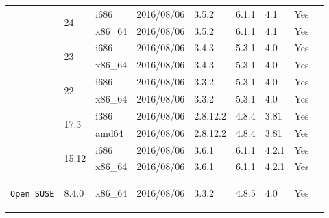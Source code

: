 \documentclass[11pt,twoside,openany,x11names,svgnames]{memoir}
\begin{document}
{\begin{longtable}{| >{\bfseries}p{3cm} | p{2cm} | p{1cm} | p{2cm} | p{1.2cm} | p{1cm} | p{1cm} | p{1cm} | p{1.5cm} |}
	\multirow{4}{*}{\texttt{Fedora Workstation}}  & \multirow{2}{*}{24}            & i686   & 2016/08/06  & 3.5.2    & 6.1.1 & 4.1   & Yes   &  \\
												    						       \cline{3-8}
	                                              &                                & x86\_64& 2016/08/06  & 3.5.2    & 6.1.1 & 4.1   & Yes   &  \\
	                                              \cline{2-8}
	                                              & \multirow{2}{*}{23}            & i686   & 2016/08/06  & 3.4.3    & 5.3.1 & 4.0   & Yes   &  \\
	                                              							       \cline{3-8}
	                                              &                                & x86\_64& 2016/08/06  & 3.4.3    & 5.3.1 & 4.0   & Yes   &  \\
	                                              \cline{2-8}
	                                              & \multirow{2}{*}{22}            & i686   & 2016/08/06  & 3.3.2    & 5.3.1 & 4.0   & Yes   &  \\
	                                              							       \cline{3-8}
	                                              &                                & x86\_64& 2016/08/06  & 3.3.2    & 5.3.1 & 4.0   & Yes   &  \\

	\hline	
	\hline
	
	\multirow{2}{*}{\texttt{Linux Mint}}          & \multirow{2}{*}{17.3}          & i386   & 2016/08/06  & 2.8.12.2 & 4.8.4 & 3.81  & Yes   &  \\
												     						       \cline{3-8}
	                                              &                                & amd64  & 2016/08/06  & 2.8.12.2 & 4.8.4 & 3.81  & Yes   &  \\

	\hline
	\hline
	
	\multirow{2}{*}{\texttt{Manjaro}}             & \multirow{2}{*}{15.12}         & i686   & 2016/08/06  & 3.6.1    & 6.1.1 & 4.2.1 & Yes   &  \\
											    							       \cline{3-8}
	                                              &                                & x86\_64& 2016/08/06  & 3.6.1    & 6.1.1 & 4.2.1 & Yes   &  \\

	\hline
	\hline
	                                         
	\texttt{Open SUSE}                            & 8.4.0                          & x86\_64& 2016/08/06  & 3.3.2    & 4.8.5 & 4.0   & Yes   &  \\
	  

\end{longtable}}
\end{document}
